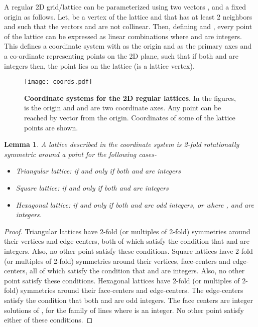 \documentclass[11pt]{article}
\newtheorem{lemma}[thm]{Lemma}
\newcommand{\1}{\mathds{1}}
\begin{document}
A regular 2D grid/lattice can be parameterized using two vectors , and a fixed origin  as follows. Let,  be a vertex of the lattice and that  has at least 2 neighbors  and  such that the vectors  and  are not collinear. Then, defining  and , every point of the lattice can be expressed as linear combinations  where  and  are integers. This defines a coordinate system  with  as the origin and  as the primary axes and a co-ordinate  representing points on the 2D plane, such that if both  and  are integers then, the point lies on the lattice (is a lattice vertex). 


\begin{figure}[h!]
\centering
\texttt{[image: coords.pdf]}
\caption[Coordinate systems for the 2D regular lattices]{ \textbf{Coordinate systems for the 2D regular lattices}. In the figures,  is the origin and  and  are two coordinate axes. Any point  can be reached by vector  from the origin. Coordinates of some of the lattice points are shown.}   
\label{fig:assemblytheory:coords}
\end{figure}

\begin{lemma}
 \label{lemma:assemblytheory:sufficient0}
 A lattice described in the  coordinate system is 2-fold rotationally symmetric around a point  for the following cases-
 \begin{itemize}
  \item Triangular lattice: if and only if both  and  are integers
  \item Square lattice: if and only if both  and  are integers
  \item Hexagonal lattice: if and only if both  and  are odd integers, or  where ,  and  are integers.
 \end{itemize}
\end{lemma}

\begin{proof}
 Triangular lattices have 2-fold (or multiples of 2-fold) symmetries around their vertices and edge-centers, both of which satisfy the condition that  and  are integers. Also, no other point satisfy these conditions.
 Square lattices have 2-fold (or multiples of 2-fold) symmetries around their vertices, face-centers and edge-centers, all of which satisfy the condition that  and  are integers. Also, no other point satisfy these conditions.
 Hexagonal lattices have 2-fold (or multiples of 2-fold) symmetries around their face-centers and edge-centers. The edge-centers satisfy the condition that both  and  are odd integers. The face centers are integer solutions of ,  for the family of lines  where  is an integer. No other point satisfy either of these conditions.
\end{proof}
\end{document}
